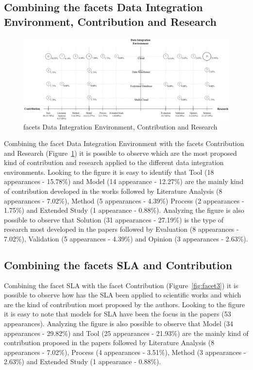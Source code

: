 \subsection{Combining the facets Data Integration Environment, Contribution and Research}

\begin{figure}[h]
\centering
\includegraphics[scale=0.5]{figs/bubble-charts/DI-Environment-Contribution-Research.pdf}
\caption{facets Data Integration Environment, Contribution and Research}\label{fig:facet2}
\end{figure}

Combining the facet Data Integration Environment with the facets Contribution and Research 
(Figure~\ref{fig:facet2}) it is possible to observe which are the most proposed kind of
contribution and research applied to the different data integration environments.  
Looking to the figure it is easy to identify that Tool (18 appearances - 15.78\%) and 
Model (14 appearance - 12.27\%) are the mainly kind of contribution developed in the works 
followed by Literature Analysis (8 appearances - 7.02\%), Method (5 appearances - 4.39\%) 
Process (2 appearances - 1.75\%) and Extended Study (1 appearance - 0.88\%).
Analyzing the figure is also possible to observe that Solution (31 appearances - 27.19\%) is 
the type of research most developed in the papers 
followed by Evaluation (8 appearances - 7.02\%), Validation (5 appearances - 4.39\%) and
Opinion (3 appearances - 2.63\%).

\subsection{Combining the facets SLA and Contribution}

Combining the facet SLA with the facet Contribution (Figure~\ref{fig:facet3}) it is possible 
to observe how has the SLA been applied to scientific works and which are the kind of contribution 
most proposed by the authors.
Looking to the figure it is easy to note that models for SLA have been the focus in the papers 
(53 appearances).
Analyzing the figure is also possible to observe that Model (34 appearances - 29.82\%) and 
Tool (25 appearances - 21.93\%) are the mainly kind of contribution proposed in the papers 
followed by Literature Analysis (8 appearances - 7.02\%), Process (4 appearances - 3.51\%), 
Method (3 appearances - 2.63\%) and Extended Study (1 appearance - 0.88\%).

